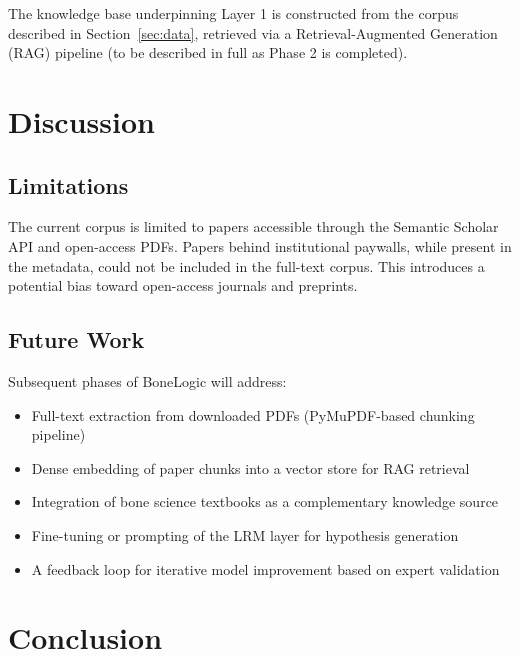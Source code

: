 \documentclass[12pt, a4paper]{article}
\begin{document}
The knowledge base underpinning Layer 1 is constructed from the corpus
described in Section~\ref{sec:data}, retrieved via a
Retrieval-Augmented Generation (RAG) pipeline (to be described in full
as Phase 2 is completed).

\section{Discussion}
\label{sec:discussion}


\subsection{Limitations}
The current corpus is limited to papers accessible through the Semantic Scholar
API and open-access PDFs. Papers behind institutional paywalls, while present
in the metadata, could not be included in the full-text corpus.
This introduces a potential bias toward open-access journals and preprints.

\subsection{Future Work}
Subsequent phases of BoneLogic will address:
\begin{itemize}
    \item Full-text extraction from downloaded PDFs (PyMuPDF-based chunking pipeline)
    \item Dense embedding of paper chunks into a vector store for RAG retrieval
    \item Integration of bone science textbooks as a complementary knowledge source
    \item Fine-tuning or prompting of the LRM layer for hypothesis generation
    \item A feedback loop for iterative model improvement based on expert validation
\end{itemize}

\section{Conclusion}
\label{sec:conclusion}

\end{document}
